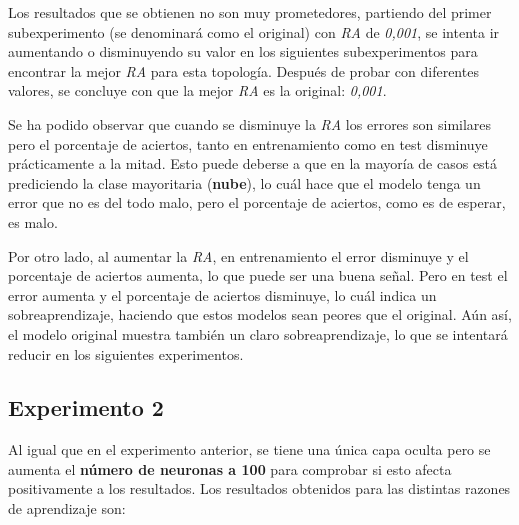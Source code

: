 \documentclass{uc3mpracticas}
\begin{document}
Los resultados que se obtienen no son muy prometedores, partiendo del primer subexperimento (se denominará como el original) con \textit{RA} de \textit{0,001}, se intenta ir aumentando o disminuyendo su valor en los siguientes subexperimentos para encontrar la mejor \textit{RA} para esta topología. Después de probar con diferentes valores, se concluye con que la mejor \textit{RA} es la original: \textit{0,001}.

\vspace{2mm}

Se ha podido observar que cuando se disminuye la \textit{RA} los errores son similares pero el porcentaje de aciertos, tanto en entrenamiento como en test disminuye prácticamente a la mitad. Esto puede deberse a que en la mayoría de casos está prediciendo la clase mayoritaria (\textbf{nube}), lo cuál hace que el modelo tenga un error que no es del todo malo, pero el porcentaje de aciertos, como es de esperar, es malo.

\vspace{1mm}

Por otro lado, al aumentar la \textit{RA}, en entrenamiento el error disminuye y el porcentaje de aciertos aumenta, lo que puede ser una buena señal. Pero en test el error aumenta y el porcentaje de aciertos disminuye, lo cuál indica un sobreaprendizaje, haciendo que estos modelos sean peores que el original. Aún así, el modelo original muestra también un claro sobreaprendizaje, lo que se intentará reducir en los siguientes experimentos.


\subsection{Experimento 2}

Al igual que en el experimento anterior, se tiene una única capa oculta pero se aumenta el \textbf{número de neuronas a 100} para comprobar si esto afecta positivamente a los resultados. Los resultados obtenidos para las distintas razones de aprendizaje son:
\end{document}
